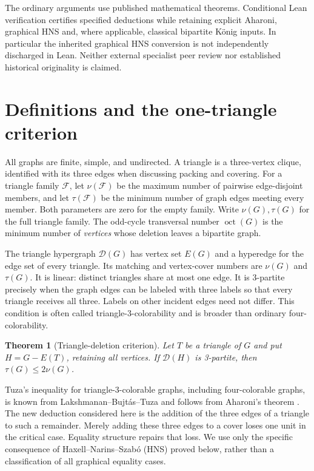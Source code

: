 \documentclass[11pt]{article}
\newtheorem{theorem}{Theorem}[section]
\theoremstyle{definition}\newtheorem{definition}[theorem]{Definition}
\theoremstyle{remark}\newtheorem{remark}[theorem]{Remark}
\newcommand{\D}{\mathcal D}
\newcommand{\oct}{\operatorname{oct}}
\begin{document}
The ordinary arguments use published mathematical theorems. Conditional Lean verification certifies specified deductions while retaining explicit Aharoni, graphical HNS and, where applicable, classical bipartite K\"onig inputs. In particular the inherited graphical HNS conversion is not independently discharged in Lean. Neither external specialist peer review nor established historical originality is claimed.

\section{Definitions and the one-triangle criterion}

All graphs are finite, simple, and undirected. A triangle is a three-vertex
clique, identified with its three edges when discussing packing and covering.
For a triangle family $\mathcal F$, let $\nu(\mathcal F)$ be the maximum
number of pairwise edge-disjoint members, and let $\tau(\mathcal F)$ be the
minimum number of graph edges meeting every member. Both parameters are zero
for the empty family. Write $\nu(G),\tau(G)$ for the full triangle family.
The odd-cycle transversal number $\oct(G)$ is the minimum number of
\emph{vertices} whose deletion leaves a bipartite graph.

The triangle hypergraph $\D(G)$ has vertex set $E(G)$ and a hyperedge for
the edge set of every triangle. Its matching and vertex-cover numbers are
$\nu(G)$ and $\tau(G)$. It is linear: distinct triangles share at most one
edge. It is 3-partite precisely when the graph edges can be labeled with
three labels so that every triangle receives all three. Labels on other
incident edges need not differ. This condition is often called
triangle-3-colorability and is broader than ordinary four-colorability.

\begin{theorem}[Triangle-deletion criterion]\label{thm:main}
Let $T$ be a triangle of $G$ and put $H=G-E(T)$, retaining all vertices.
If $\D(H)$ is 3-partite, then $\tau(G)\le2\nu(G)$.
\end{theorem}

Tuza's inequality for triangle-3-colorable graphs, including four-colorable
graphs, is known from Lakshmanan--Bujt\'as--Tuza \cite{LBT} and follows from
Aharoni's theorem \cite{Aharoni}. The new deduction considered here is the
addition of the three edges of a triangle to such a remainder. Merely
adding these three edges to a cover loses one unit in the critical case.
Equality structure repairs that loss. We use only the specific consequence
of Haxell--Narins--Szab\'o (HNS) \cite{HNS} proved below, rather than a
classification of all graphical equality cases.
\end{document}
